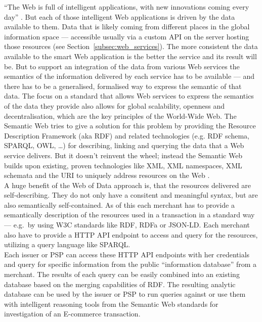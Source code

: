 ``The Web is full of intelligent applications, with new innovations coming every day'' \citep{allemang2011semantic}. But each of those intelligent Web applications is driven by the data available to them. Data that is likely coming from different places in the global information space — accessible usually via a custom API on the server hosting those resources (see Section~\ref{subsec:web_services}). The more consistent the data available to the smart Web application is the better the service and its result will be. But to support an integration of the data from various Web services the semantics of the information delivered by each service has to be available — and there has to be a generalised, formalised way to express the semantic of that data. The focus on a standard that allows Web services to express the semantics of the data they provide also allows for global scalability, openness and decentralisation, which are the key principles of the World-Wide Web. The Semantic Web tries to give a solution for this problem by providing the Resource Description Framework (aka \gls{RDF}) and related technologies (e.g. RDF schema, SPARQL, OWL, \ldots) for describing, linking and querying the data that a Web service delivers. But it doesn’t reinvent the wheel; instead the Semantic Web builds upon existing, proven technologies like XML, XML namespaces, XML schemata and the \gls{URI} to uniquely address resources on the Web \citep{allemang2011semantic}. \\

A huge benefit of the Web of Data approach is, that the resources delivered are self-describing. They do not only have a consitent and meaningful syntax, but are also semantically self-contained. As of this each merchant has to provide a semantically description of the resources used in a transaction in a standard way --- e.g.\ by using \gls{W3C} standards like \gls{RDF}, \gls{RDFa} or \gls{JSON-LD}. Each merchant also have to provide a \gls{HTTP} \gls{API} endpoint to access and query for the resources, utilizing a query language like \gls{SPARQL}. \\

Each issuer or \gls{PSP} can access these \gls{HTTP} \gls{API} endpoints with her credentials and query for specific information from the public ``information database'' from a merchant. The results of each query can be easily combined into an existing database based on the merging capabilities of \gls{RDF}. The resulting analytic database can be used by the issuer or \gls{PSP} to run queries against or use them with intelligent reasoning tools from the Semantic Web standards for investigation of an E-commerce transaction. \\

